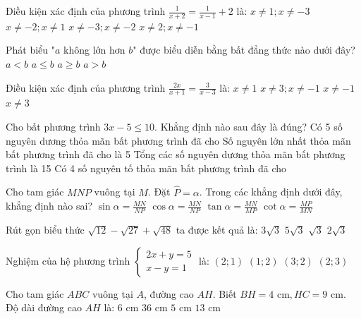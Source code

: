 \documentclass[12pt,a4paper]{article}
\begin{document}
\begin{ex}
Điều kiện xác định của phương trình $\frac{1}{x + 2} = \frac{1}{x - 1} + 2$ là:
\choice
{$x \neq 1; x \neq -3$}
{\True $x \neq -2; x \neq 1$}
{$x \neq -3; x \neq -2$}
{$x \neq 2; x \neq -1$}
\end{ex}

\begin{ex}
Phát biểu "$a$ không lớn hơn $b$" được biểu diễn bằng bất đẳng thức nào dưới đây?
\choice
{$a < b$}
{\True $a \le b$}
{$a \ge b$}
{$a > b$}
\end{ex}

\begin{ex}
Điều kiện xác định của phương trình $\frac{2x}{x + 1} = \frac{3}{x - 3}$ là:
\choice
{$x \neq 1$}
{\True $x \neq 3; x \neq -1$}
{$x \neq -1$}
{$x \neq 3$}
\end{ex}

\begin{ex}
Cho bất phương trình $3x - 5 \le 10$. Khẳng định nào sau đây là đúng?
\choice
{Có 5 số nguyên dương thỏa mãn bất phương trình đã cho}
{Số nguyên lớn nhất thỏa mãn bất phương trình đã cho là 5}
{\True Tổng các số nguyên dương thỏa mãn bất phương trình là 15}
{Có 4 số nguyên tố thỏa mãn bất phương trình đã cho}
\end{ex}

\begin{ex}
Cho tam giác $MNP$ vuông tại $M$. Đặt $\widehat{P} = \alpha$. Trong các khẳng định dưới đây, khẳng định nào sai?
\choice
{$\sin \alpha = \frac{MN}{NP}$}
{\True $\cos \alpha = \frac{MN}{NP}$}
{$\tan \alpha = \frac{MN}{MP}$}
{$\cot \alpha = \frac{MP}{MN}$}
\end{ex}

\begin{ex}
Rút gọn biểu thức $\sqrt{12} - \sqrt{27} + \sqrt{48}$ ta được kết quả là:
\choice
{\True $3\sqrt{3}$}
{$5\sqrt{3}$}
{$\sqrt{3}$}
{$2\sqrt{3}$}
\end{ex}

\begin{ex}
Nghiệm của hệ phương trình $\begin{cases} 2x + y = 5 \\ x - y = 1 \end{cases}$ là:
\choice
{\True $(2; 1)$}
{$(1; 2)$}
{$(3; 2)$}
{$(2; 3)$}
\end{ex}

\begin{ex}
Cho tam giác $ABC$ vuông tại $A$, đường cao $AH$. Biết $BH = 4\text{ cm}, HC = 9\text{ cm}$. Độ dài đường cao $AH$ là:
\choice
{\True $6\text{ cm}$}
{$36\text{ cm}$}
{$5\text{ cm}$}
{$13\text{ cm}$}
\end{ex}
\end{document}
